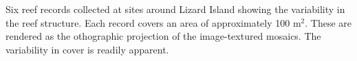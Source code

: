 \label{fig:six_samples} Six reef records collected at sites around Lizard Island showing the variability in the reef structure. Each record covers an area of approximately 100 m$^2$. These are rendered as the othographic projection of the image-textured mosaics. The variability in cover is readily apparent.